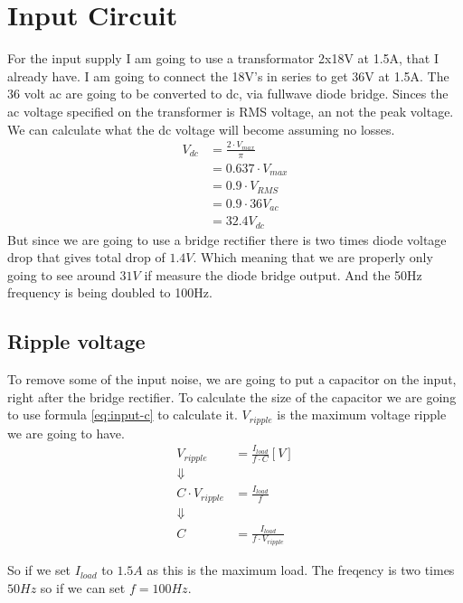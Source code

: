 \section{Input Circuit}
For the input supply I am going to use a transformator 2x18V at 1.5A, that I already have. I am going to connect the 18V's in series to get 36V at 1.5A.
The 36 volt ac are going to be converted to dc, via fullwave diode bridge. Sinces the ac voltage specified on the transformer is RMS voltage, an not the peak voltage. We can calculate what the dc voltage will become assuming no losses.
\begin{align} \label{eq:calc_vdc}
V_{ dc } &= \frac{ 2 \cdot V_{ max } }{ \pi } \\
         &= 0.637 \cdot V_{ max } \\
         &= 0.9 \cdot V_{ RMS } \\
         &= 0.9 \cdot 36 V_{ac} \nonumber \\
         &= 32.4 V_{ dc } \nonumber
\end{align}
But since we are going to use a bridge rectifier there is two times diode voltage drop that gives total drop of \(1.4V\). Which meaning that we are properly only going to see around \( 31V \) if measure the diode bridge output. And the 50Hz frequency is being doubled to 100Hz.

\subsection{Ripple voltage}
To remove some of the input noise, we are going to put a capacitor on the input, right after the bridge rectifier. To calculate the size of the capacitor we are going to use formula \ref{eq:input-c} to calculate it. $V_{ ripple }$ is the maximum voltage ripple we are going to have.
\begin{align}\label{eq:calc_vripple}
V_{ ripple } &= \frac{ I_{ load } }{ f \cdot C } [V] \\ 
\Downarrow \nonumber \\
C \cdot V_{ ripple } &= \frac{ I_{ load } }{ f } \nonumber \\
\Downarrow \nonumber \\
C &= \frac{ I_{ load } }{ f \cdot V_{ ripple } }\label{eq:input-c}
\end{align}

So if we set $I_{ load }$ to $1.5A$ as this is the maximum load. The freqency is two times $50Hz$ so if we can set $f=100Hz$.


